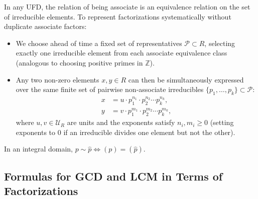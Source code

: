 \begin{content}
\begin{steps}
In any UFD, the relation of being associate is an equivalence relation on the set of irreducible elements. To represent factorizations systematically without duplicate associate factors:
\begin{itemize}
    \item We choose ahead of time a fixed set of representatives $\mathcal{P} \subset R$, selecting exactly one irreducible element from each associate equivalence class (analogous to choosing positive primes in $\mathbb{Z}$).
    \item Any two non-zero elements $x, y \in R$ can then be simultaneously expressed over the same finite set of pairwise non-associate irreducibles $\{p_1, \dots, p_k\} \subset \mathcal{P}$:
    \begin{align}
    x &= u \cdot p_1^{n_1} \cdot p_2^{n_2} \cdots p_k^{n_k}, \label{eq:part4-x-grouped-fact} \\
    y &= v \cdot p_1^{m_1} \cdot p_2^{m_2} \cdots p_k^{m_k}, \label{eq:part4-y-grouped-fact}
    \end{align}
    where $u, v \in \mathcal{U}_R$ are units and the exponents satisfy $n_i, m_i \ge 0$ (setting exponents to $0$ if an irreducible divides one element but not the other).
\end{itemize}
\end{steps}
\end{content}

\begin{aiNote}
In an integral domain, $p \sim \hat{p} \iff (p) = (\hat{p})$.
\end{aiNote}

\subsection{Formulas for GCD and LCM in Terms of Factorizations}


